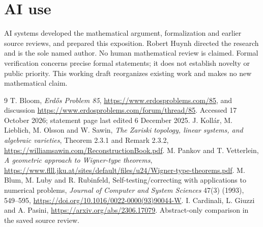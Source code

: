\documentclass[11pt]{article}
\begin{document}
\section{AI use}
AI systems developed the mathematical argument, formalization and earlier
source reviews, and prepared this exposition. Robert Huynh directed the
research and is the sole named author. No human mathematical review is
claimed. Formal verification concerns precise formal statements; it
does not establish novelty or public priority. This working draft
reorganizes existing work and makes no new mathematical claim.

\begin{thebibliography}{9}
 T. Bloom, \emph{Erd\H{o}s Problem 85},
\url{https://www.erdosproblems.com/85}, and discussion
\url{https://www.erdosproblems.com/forum/thread/85}.
Accessed 17 October 2026; statement page last edited 6 December 2025.
 J. Koll\'ar, M. Lieblich, M. Olsson and W. Sawin,
\emph{The Zariski topology, linear systems, and algebraic varieties},
Theorem 2.3.1 and Remark 2.3.2,
\url{https://williamsawin.com/ReconstructionBook.pdf}.
 M. Pankov and T. Vetterlein,
\emph{A geometric approach to Wigner-type theorems},
\url{https://www.flll.jku.at/sites/default/files/u24/Wigner-type-theorems.pdf}.
 M. Blum, M. Luby and R. Rubinfeld,
Self-testing/correcting with applications to numerical problems,
\emph{Journal of Computer and System Sciences} 47(3) (1993), 549--595,
\url{https://doi.org/10.1016/0022-0000(93)90044-W}.
 I. Cardinali, L. Giuzzi and A. Pasini,
\url{https://arxiv.org/abs/2306.17079}. Abstract-only comparison in the
saved source review.
\end{thebibliography}
\end{document}
